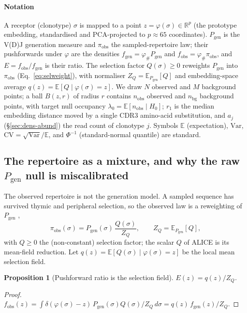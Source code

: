 \documentclass[11pt]{article}
\theoremstyle{oldplain}
\newtheorem{proposition}{Proposition}
\theoremstyle{oldrem}
\newcommand{\Pgen}{P_{\mathrm{gen}}}
\newcommand{\R}{\mathds{R}}  %
\newcommand{\E}{\mathds{E}}
\begin{document}
\paragraph{Notation} A receptor (clonotype) $\sigma$ is mapped to a point $z=\varphi(\sigma)\in\R^{p}$ (the
prototype embedding, standardised and {\scshape PCA}-projected to $p\approx65$ coordinates). $\Pgen$ is the
V(D)J generation measure and $\pi_{\mathrm{obs}}$ the sampled-repertoire law; their pushforwards under
$\varphi$ are the densities $f_{\mathrm{gen}}=\varphi_{\#}\Pgen$ and $f_{\mathrm{obs}}=\varphi_{\#}\pi_{\mathrm{obs}}$,
and $E=f_{\mathrm{obs}}/f_{\mathrm{gen}}$ is their ratio. The selection factor $Q(\sigma)\ge0$ reweights
$\Pgen$ into $\pi_{\mathrm{obs}}$ (Eq.~\eqref{eq:selweight}), with normaliser $Z_Q=\E_{\Pgen}[Q]$ and
embedding-space average $q(z)=\E[Q\mid\varphi(\sigma)=z]$. We draw $N$ observed and $M$ background points; a
ball $B(z,r)$ of radius $r$ contains $n_{\mathrm{obs}}$ observed and $n_{\mathrm{bg}}$ background points, with
target null occupancy $\lambda_0=\E[n_{\mathrm{obs}}\mid H_0]$; $r_1$ is the median embedding distance moved by
a single {\scshape CDR3} amino-acid substitution, and $a_j$ (\S\ref{sec:dens-abund}) the read count of
clonotype $j$. Symbols $\E$ (expectation), $\mathrm{Var}$, $\mathrm{CV}=\sqrt{\mathrm{Var}}/\E$, and
$\Phi^{-1}$ (standard-normal quantile) are standard.

\subsection{The repertoire as a mixture, and why the raw \texorpdfstring{$\Pgen$}{Pgen} null is
miscalibrated}\label{sec:dens-mix}

The observed repertoire is not the generation model. A sampled sequence has survived thymic and peripheral
selection, so the observed law is a reweighting of $\Pgen$ \cite{Elhanati2014,Sethna2020},
\begin{equation}\label{eq:selweight}
  \pi_{\mathrm{obs}}(\sigma)=\Pgen(\sigma)\,\frac{Q(\sigma)}{Z_Q},\qquad Z_Q=\E_{\Pgen}[Q],
\end{equation}
with $Q\ge0$ the (non-constant) selection factor; the scalar $Q$ of {\scshape ALICE} is its mean-field
reduction. Let $q(z)=\E[Q(\sigma)\mid\varphi(\sigma)=z]$ be the local mean selection field.

\begin{proposition}[Pushforward ratio is the selection field]\label{prop:selfield}
$E(z)=q(z)/Z_Q$.
\end{proposition}
\begin{proof}
$f_{\mathrm{obs}}(z)=\int\delta(\varphi(\sigma)-z)\,\Pgen(\sigma)Q(\sigma)/Z_Q\,d\sigma
= q(z)\,f_{\mathrm{gen}}(z)/Z_Q$.
\end{proof}
\end{document}
